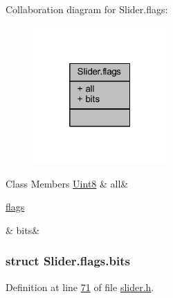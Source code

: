 Collaboration diagram for Slider.\+flags\+:
\nopagebreak
\begin{figure}[H]
\begin{center}
\leavevmode
\includegraphics[width=145pt]{d5/df1/a00206}
\end{center}
\end{figure}
\begin{DoxyFields}{Class Members}
\hypertarget{a00025_aa181a603769c1f98ad927e7367c7aa51}{\hyperlink{a00001_a979e3e23b9a449e69ab6a8a83b6042f8}{Uint8}}\label{a00025_aa181a603769c1f98ad927e7367c7aa51}
&
all&
\\
\hline

\hypertarget{a00025_acc411e6c13670e52124629b8ac83f7d0}{\hyperlink{a00025_df/dcd/a00127}{flags}}\label{a00025_acc411e6c13670e52124629b8ac83f7d0}
&
bits&
\\
\hline

\end{DoxyFields}
\label{df/dcd/a00127}
\hypertarget{a00025_df/dcd/a00127}{}
\subsubsection{struct Slider.\+flags.\+bits}


Definition at line \hyperlink{a00025_source_l00071}{71} of file \hyperlink{a00025_source}{slider.\+h}.



